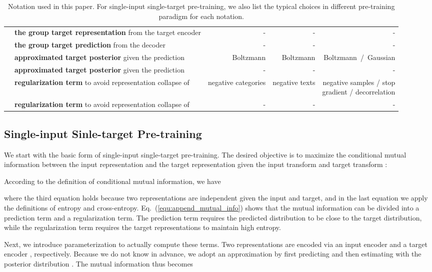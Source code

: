 \documentclass[10pt,twocolumn,letterpaper]{article}
\begin{document}
\begin{table*}[ht!]
{\begin{tabular}{llrrr}
     & \textbf{the  group target representation} from the target encoder  & - & - & - \\
     & \textbf{the  group target prediction} from the decoder  & - & - & - \\
    \midrule
     & \textbf{approximated target posterior} given the prediction  & Boltzmann & Boltzmann & Boltzmann~/~Gaussian\vspace{0.5em}\\
     & \textbf{approximated target posterior} given the prediction  & - & - & - \\
    \midrule
     & \textbf{regularization term} to avoid representation collapse of  & negative categories & negative texts & \makecell[r]{negative samples / stop \\gradient / decorrelation}\vspace{0.5em}\\
     & \textbf{regularization term} to avoid representation collapse of  & - & - & - \\
    \bottomrule
    \end{tabular}}
    \caption{Notation used in this paper. For single-input single-target pre-training, we also list the typical choices in different pre-training paradigm for each notation.}
    \label{tab:notation}
\end{table*} 
\subsection{Single-input Sinle-target Pre-training}
We start with the basic form of single-input single-target pre-training. The desired objective is to maximize the conditional mutual information between the input representation  and the target representation  given the input transform  and target transform :

According to the definition of conditional mutual information, we have

where the third equation holds because two representations are independent given the input and target, and in the last equation we apply the definitions of entropy and cross-entropy. Eq.~(\ref{equ:append_mutual_info}) shows that the mutual information can be divided into a prediction term and a regularization term. The prediction term requires the predicted distribution to be close to the target distribution, while the regularization term requires the target representations to maintain high entropy.

Next, we introduce parameterization to actually compute these terms. Two representations are encoded via an input encoder  and a target encoder , respectively. Because we do not know  in advance, we adopt an approximation by first predicting  and then estimating with the posterior distribution . 
The mutual information thus becomes
\end{document}
